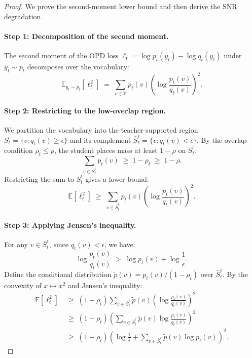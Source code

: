 \begin{proof}
We prove the second-moment lower bound and then derive the SNR degradation.

\paragraph{Step 1: Decomposition of the second moment.}
The second moment of the OPD loss $\ell_t = \log p_t(y_t) - \log q_t(y_t)$ under $y_t \sim p_t$ decomposes over the vocabulary:
\begin{equation}
    \mathbb{E}_{y_t \sim p_t}[\ell_t^2]
    \;=\;
    \sum_{v \in \mathcal{V}} p_t(v) \left(\log \frac{p_t(v)}{q_t(v)}\right)^2.
\end{equation}

\paragraph{Step 2: Restricting to the low-overlap region.}
We partition the vocabulary into the teacher-supported region $S_t^\epsilon = \{v : q_t(v) \ge \epsilon\}$ and its complement $\bar{S}_t^\epsilon = \{v : q_t(v) < \epsilon\}$. By the overlap condition $\rho_t \le \rho$, the student places mass at least $1 - \rho$ on $\bar{S}_t^\epsilon$:
\begin{equation}
    \sum_{v \in \bar{S}_t^\epsilon} p_t(v) \;\ge\; 1 - \rho_t \;\ge\; 1 - \rho.
\end{equation}
Restricting the sum to $\bar{S}_t^\epsilon$ gives a lower bound:
\begin{equation}
    \mathbb{E}[\ell_t^2]
    \;\ge\;
    \sum_{v \in \bar{S}_t^\epsilon} p_t(v) \left(\log \frac{p_t(v)}{q_t(v)}\right)^2.
\end{equation}

\paragraph{Step 3: Applying Jensen's inequality.}
For any $v \in \bar{S}_t^\epsilon$, since $q_t(v) < \epsilon$, we have:
\begin{equation}
    \log \frac{p_t(v)}{q_t(v)} \;>\; \log p_t(v) + \log \frac{1}{\epsilon}.
\end{equation}
Define the conditional distribution $\tilde{p}(v) = p_t(v)/(1-\rho_t)$ over $\bar{S}_t^\epsilon$. By the convexity of $x \mapsto x^2$ and Jensen's inequality:
\begin{align}
    \mathbb{E}[\ell_t^2]
    &\;\ge\;
    (1-\rho_t) \sum_{v \in \bar{S}_t^\epsilon} \tilde{p}(v) \left(\log \frac{p_t(v)}{q_t(v)}\right)^2 \nonumber \\
    &\;\ge\;
    (1-\rho_t) \left(
    \sum_{v \in \bar{S}_t^\epsilon} \tilde{p}(v) \log \frac{p_t(v)}{q_t(v)}
    \right)^2 \nonumber \\
    &\;\ge\;
    (1-\rho_t) \left(
    \log \frac{1}{\epsilon} + \sum_{v \in \bar{S}_t^\epsilon} \tilde{p}(v) \log p_t(v)
    \right)^2.
\end{align}


\end{proof}
